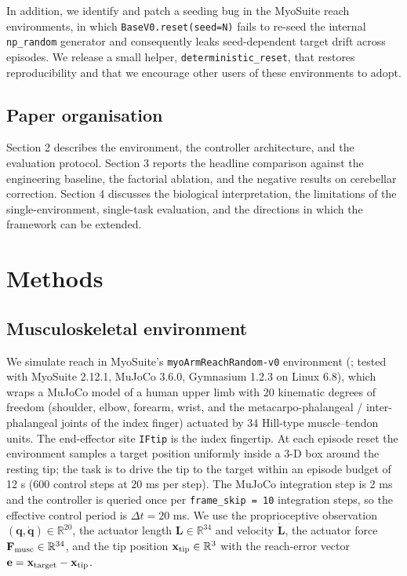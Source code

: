 \documentclass[sn-basic]{sn-jnl}
\begin{document}
In addition, we identify and patch a seeding bug in the MyoSuite reach
environments, in which \texttt{BaseV0.reset(seed=N)} fails to re-seed
the internal \texttt{np\_random} generator and consequently leaks
seed-dependent target drift across episodes. We release a small helper,
\texttt{deterministic\_reset}, that restores reproducibility and that we
encourage other users of these environments to adopt.

\subsection{Paper organisation}

Section 2 describes the environment, the controller architecture, and
the evaluation protocol. Section 3 reports the headline comparison
against the engineering baseline, the factorial ablation, and the
negative results on cerebellar correction. Section 4 discusses the
biological interpretation, the limitations of the single-environment,
single-task evaluation, and the directions in which the framework can be
extended.


\section{Methods}

\subsection{Musculoskeletal
environment}

We simulate reach in MyoSuite's \texttt{myoArmReachRandom-v0}
environment (\citealt{caggiano2022}; tested with MyoSuite 2.12.1, MuJoCo
3.6.0, Gymnasium 1.2.3 on Linux 6.8), which wraps a MuJoCo \citep{todorov2012} model of a human upper limb with 20 kinematic degrees of
freedom (shoulder, elbow, forearm, wrist, and the metacarpo-phalangeal /
inter-phalangeal joints of the index finger) actuated by 34 Hill-type
muscle--tendon units. The end-effector site \texttt{IFtip} is the index
fingertip. At each episode reset the environment samples a target
position uniformly inside a 3-D box around the resting tip; the task is
to drive the tip to the target within an episode budget of 12 s (600
control steps at 20 ms per step). The MuJoCo integration step is 2 ms
and the controller is queried once per \texttt{frame\_skip\ =\ 10}
integration steps, so the effective control period is \(\Delta t = 20\)
ms. We use the proprioceptive observation
\((\mathbf{q},\dot{\mathbf{q}}) \in \mathbb{R}^{20}\), the actuator
length \(\mathbf{L} \in \mathbb{R}^{34}\) and velocity
\(\dot{\mathbf{L}}\), the actuator force
\(\mathbf{F}_{\rm musc} \in \mathbb{R}^{34}\), and the tip position
\(\mathbf{x}_{\rm tip} \in \mathbb{R}^{3}\) with the reach-error vector
\(\mathbf{e} = \mathbf{x}_{\rm target} - \mathbf{x}_{\rm tip}\).
\end{document}

